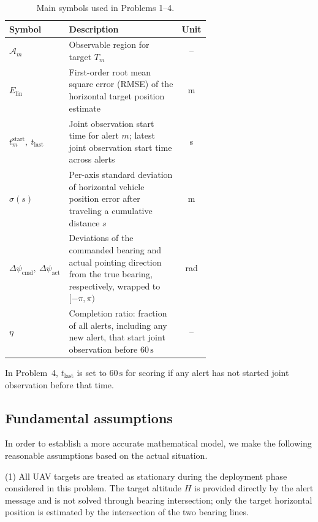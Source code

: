\documentclass{swmcmthesis}
\begin{document}
\begin{table}[!htb]
    \centering
    \caption{Main symbols used in Problems 1--4.}
    \label{tab:ParemeterSetup}
    \begin{tabular}{@{}l >{\raggedright\arraybackslash}p{0.65\linewidth} c@{}}
        \toprule
        Symbol & Description & Unit \\
        \midrule
        \(\mathcal A_m\) & Observable region for target \(T_m\) & -- \\
        \(E_{\mathrm{lin}}\) & First-order root mean square error (RMSE) of the
            horizontal target position estimate & m \\
        \(t_m^{\mathrm{start}},\ t_{\mathrm{last}}\) & Joint observation start time
            for alert \(m\); latest joint observation start time across alerts & s \\
        \(\sigma(s)\) & Per-axis standard deviation of horizontal vehicle position
            error after traveling a cumulative distance \(s\) & m \\
        \(\Delta\psi_{\mathrm{cmd}},\ \Delta\psi_{\mathrm{act}}\) & Deviations of the
            commanded bearing and actual pointing direction from the true bearing,
            respectively, wrapped to \([-\pi,\pi)\) & rad \\
        \(\eta\) & Completion ratio: fraction of all alerts, including any new alert,
            that start joint observation before \(60\,\mathrm{s}\) & -- \\
        \bottomrule
    \end{tabular}
    \par\smallskip
    \raggedright
    In Problem~4, \(t_{\mathrm{last}}\) is set to \(60\,\mathrm{s}\) for scoring
    if any alert has not started joint observation before that time.
\end{table}

\subsection{Fundamental assumptions}
\label{sec:assumptions}

In order to establish a more accurate mathematical model, we make the following reasonable assumptions based on the actual situation.

(1) All UAV targets are treated as stationary during the deployment phase considered in this problem. The target altitude $H$ is provided directly by the alert message and is not solved through bearing intersection; only the target horizontal position is estimated by the intersection of the two bearing lines.
\end{document}

